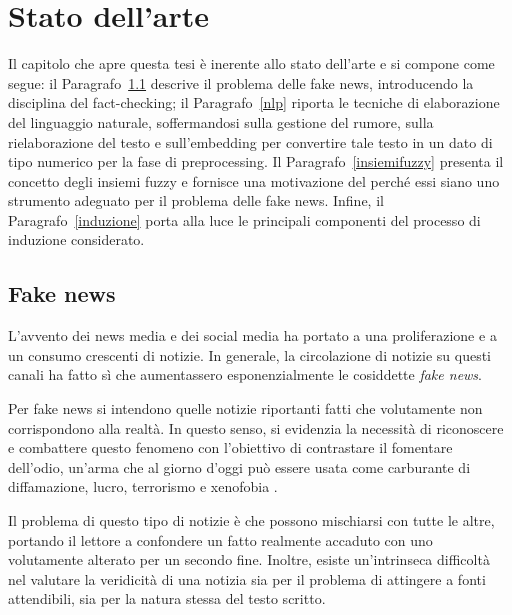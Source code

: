 \documentclass[12pt]{report}
\theoremstyle{definition}
\begin{document}
\chapter{Stato dell'arte}
\label{Capitolo 1}
\onehalfspacing

Il capitolo che apre questa tesi è inerente allo stato dell'arte e si compone come segue: il Paragrafo~\ref{fakenews} descrive il problema delle fake news, introducendo la disciplina del fact-checking; il Paragrafo~\ref{nlp} riporta le tecniche di elaborazione del linguaggio naturale, soffermandosi sulla gestione del rumore, sulla rielaborazione del testo e sull'embedding per convertire tale testo in un dato di tipo numerico per la fase di preprocessing. 
Il Paragrafo~\ref{insiemifuzzy} presenta il concetto degli insiemi fuzzy e fornisce una motivazione del perché essi siano uno strumento adeguato per il problema delle fake news.
Infine, il Paragrafo~\ref{induzione} porta alla luce le principali componenti del processo di induzione considerato.

\section{Fake news} \label{fakenews}
L'avvento dei news media e dei social media ha portato a una proliferazione e a un consumo crescenti di notizie.
In generale, la circolazione di notizie su questi canali ha fatto sì che aumentassero esponenzialmente le cosiddette \textit{fake news}.

Per fake news si intendono quelle notizie riportanti fatti che volutamente non corrispondono alla realtà.
In questo senso, si evidenzia la necessità di riconoscere e combattere questo fenomeno con l'obiettivo di contrastare il fomentare dell'odio, un'arma che al giorno d'oggi può essere usata come carburante di diffamazione, lucro, terrorismo e xenofobia \cite{4}.

Il problema di questo tipo di notizie è che possono mischiarsi con tutte le altre, portando il lettore a confondere un fatto realmente accaduto con uno volutamente alterato per un secondo fine.
Inoltre, esiste un'intrinseca difficoltà nel valutare la veridicità di una notizia sia per il problema di attingere a fonti attendibili, sia per la natura stessa del testo scritto.
\end{document}
